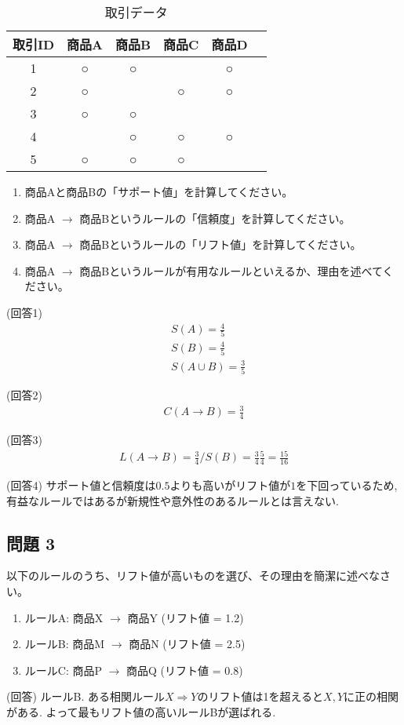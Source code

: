 \documentclass[dvipdfmx, 10pt]{jsarticle}
\begin{document}
\begin{table}[h]
\centering
\begin{tabular}{cccccc}
\toprule
取引ID & 商品A & 商品B & 商品C & 商品D \\
\midrule
1 & ○ & ○ &  & ○ \\
2 & ○ &  & ○ & ○ \\
3 & ○ & ○ &  &  \\
4 &  & ○ & ○ & ○ \\
5 & ○ & ○ & ○ &  \\
\bottomrule
\end{tabular}
\caption{取引データ}
\end{table}

\begin{enumerate}
    \item 商品Aと商品Bの「サポート値」を計算してください。
    \item 商品A $\rightarrow$ 商品Bというルールの「信頼度」を計算してください。
    \item 商品A $\rightarrow$ 商品Bというルールの「リフト値」を計算してください。
    \item 商品A $\rightarrow$ 商品Bというルールが有用なルールといえるか、理由を述べてください。
\end{enumerate}

(回答1)
\begin{align*}
    & S(A) = \frac{4}{5}\\
    & S(B) = \frac{4}{5}\\
    & S(A \cup B) = \frac{3}{5}
\end{align*}

(回答2)
\begin{align*}
    C(A \rightarrow B) = \frac{3}{4}
\end{align*}

(回答3)
\begin{align*}
    L(A \rightarrow B) = \frac{3}{4} / S(B) = \frac{3}{4} \frac{5}{4} = \frac{15}{16}
\end{align*}

(回答4)
サポート値と信頼度は\(0.5\)よりも高いがリフト値が\(1\)を下回っているため, 
有益なルールではあるが新規性や意外性のあるルールとは言えない. 

\subsection*{問題 3}
以下のルールのうち、リフト値が高いものを選び、その理由を簡潔に述べなさい。

\begin{enumerate}
    \item ルールA: 商品X $\rightarrow$ 商品Y (リフト値 = 1.2)
    \item ルールB: 商品M $\rightarrow$ 商品N (リフト値 = 2.5)
    \item ルールC: 商品P $\rightarrow$ 商品Q (リフト値 = 0.8)
\end{enumerate}

(回答)
ルールB. ある相関ルール\(X \Rightarrow Y\)のリフト値は1を超えると\(X, Y\)に正の相関がある. 
よって最もリフト値の高いルールBが選ばれる. 
\end{document}
